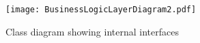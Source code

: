 \documentclass[../report.tex]{subfiles}
\begin{document}
\graphicspath{{img/}{../img/}}

\begin{landscape}
\begin{figure}[!h]
\texttt{[image: BusinessLogicLayerDiagram2.pdf]}
\caption{Class diagram showing internal interfaces}
\label{fig:BusinessLogic_InternalInterfaces}
\end{figure}

\end{landscape}
\end{document}
